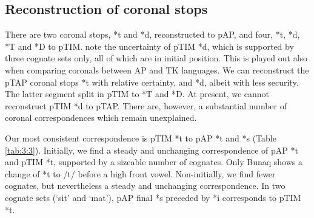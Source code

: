 \subsection{Reconstruction of coronal stops}
There are two coronal stops, *t and *d, reconstructed to pAP, and four, *t, *d, *T and *D to pTIM. \citet{SchapperEtAl2012} note the uncertainty of pTIM *d, which is supported by three cognate sets only, all of which are in initial position. This is played out also when comparing coronals between AP and TK languages. We can reconstruct the pTAP coronal stops *t with relative certainty, and *d, albeit with less security. The latter segment split in pTIM to *T and *D. At present, we cannot reconstruct pTIM *d to pTAP. There are, however, a substantial number of coronal correspondences which remain unexplained. 

Our most consistent correspondence is pTIM *t to pAP *t and *s (Table \ref{tab:3:3}). Initially, we find a steady and unchanging correspondence of pAP *t and pTIM *t, supported by a sizeable number of cognates. Only Bunaq shows a change of *t to /t{\textesh}/ before a high front vowel. Non-initially, we find fewer cognates, but nevertheless a steady and unchanging correspondence. In two cognate sets (`sit' and `mat'), pAP final *s preceded by *i corresponds to pTIM *t.
 

